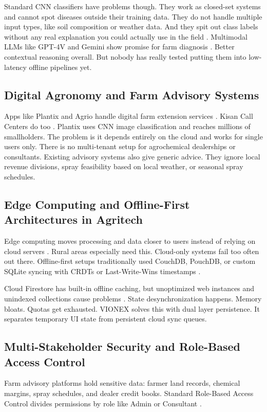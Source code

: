 \documentclass[conference]{IEEEtran}
\begin{document}
Standard CNN classifiers have problems though. They work as closed-set systems and cannot spot diseases outside their training data. They do not handle multiple input types, like soil composition or weather data. And they spit out class labels without any real explanation you could actually use in the field \cite{ferentinos2018}. Multimodal LLMs like GPT-4V and Gemini show promise for farm diagnosis \cite{gemini2023}. Better contextual reasoning overall. But nobody has really tested putting them into low-latency offline pipelines yet.

\subsection{Digital Agronomy and Farm Advisory Systems}
Apps like Plantix and Agrio handle digital farm extension services \cite{caria2021}. Kisan Call Centers do too \cite{rathore2020}. Plantix uses CNN image classification and reaches millions of smallholders. The problem is it depends entirely on the cloud and works for single users only. There is no multi-tenant setup for agrochemical dealerships or consultants. Existing advisory systems also give generic advice. They ignore local revenue divisions, spray feasibility based on local weather, or seasonal spray schedules.

\subsection{Edge Computing and Offline-First Architectures in Agritech}
Edge computing moves processing and data closer to users instead of relying on cloud servers \cite{shi2016}. Rural areas especially need this. Cloud-only systems fail too often out there. Offline-first setups traditionally used CouchDB, PouchDB, or custom SQLite syncing with CRDTs or Last-Write-Wins timestamps \cite{shapiro2011}. 

Cloud Firestore has built-in offline caching, but unoptimized web instances and unindexed collections cause problems \cite{kleppmann2017}. State desynchronization happens. Memory bloats. Quotas get exhausted. VIONEX solves this with dual layer persistence. It separates temporary UI state from persistent cloud sync queues.

\subsection{Multi-Stakeholder Security and Role-Based Access Control}
Farm advisory platforms hold sensitive data: farmer land records, chemical margins, spray schedules, and dealer credit books. Standard Role-Based Access Control divides permissions by role like Admin or Consultant \cite{sandhu1996}. 
\end{document}

